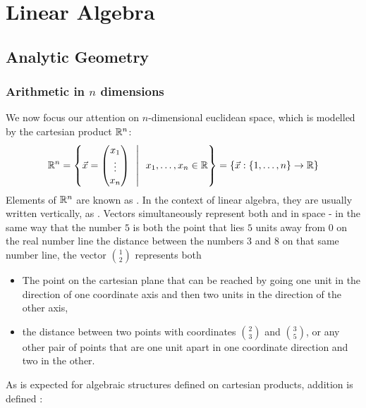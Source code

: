 \part{Linear Algebra}
\parttoc
\chapter{Analytic Geometry}
\section{Arithmetic in $n$ dimensions}
We now focus our attention on $n$-dimensional euclidean space, which is modelled by the cartesian product $\mathbb{R}^n$:
\begin{align*}
	\mathbb{R}^n = 
	\qty{
	\vec{x}=
	\begin{pmatrix}
		x_1\\
		\vdots\\
		x_n
	\end{pmatrix}
	~
	~\middle|~~
	x_1, \hdots, x_n \in \mathbb{R}}
	=
	\qty{\vec{x}: \qty{1, \hdots, n} \to \mathbb{R}}
\end{align*}
Elements of $\mathbb{R}^n$ are known as .
In the context of linear algebra, they are usually written vertically, as .
\newpar
Vectors simultaneously represent both  and  in space - in the same way that the number $5$ is both the point that lies $5$ units away from $0$ on the real number line  the distance between the numbers $3$ and $8$ on that same number line, the vector $\binom{1}{2}$ represents both
\begin{itemize}
	\item The point on the cartesian plane that can be reached by going one unit in the direction of one coordinate axis and then two units in the direction of the other axis, 
	\item the distance between two points with coordinates $\binom{2}{3}$ and $\binom{3}{5}$, or any other pair of points that are one unit apart in one coordinate direction and two in the other.
\end{itemize}
As is expected for algebraic structures defined on cartesian products, addition is defined :
